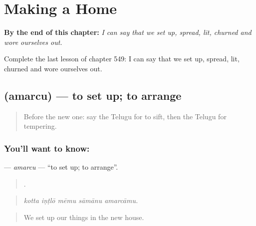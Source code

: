 
\chapter{Making a Home}
\label{ch:te-making-a-home}

\begin{chapteropening}
\textbf{By the end of this chapter:} \emph{I can say that we set up, spread, lit, churned and wore ourselves out.}

Complete the last lesson of chapter 549: I can say that we set up, spread, lit, churned and wore ourselves out.
\end{chapteropening}

\section[\texorpdfstring{\te{అమర్చు} (amarcu)}{అమర్చు (amarcu)}]{ (amarcu) — to set up; to arrange}

\label{lesson:TE-C549-amarcu}



\begin{quote}
Before the new one: say the Telugu for to sift, then the Telugu for tempering.
\end{quote}

\subsection*{You'll want to know: }
\textbf{} — \emph{amarcu} — \textquotedblleft{}to set up; to arrange\textquotedblright{}.

\begin{quote}
    .
\end{quote}

\begin{quote}
\emph{kotta iṇṭlō mēmu sāmānu amarcāmu.}
\end{quote}

\begin{quote}
We set up our things in the new house.
\end{quote}

